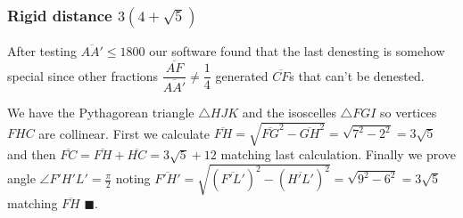 \documentclass[11pt]{article}
\begin{document}
\subsubsection{Rigid distance $3(4 + \sqrt5)$}

After testing $\overline{AA'} \le 1800$ our software found that the last denesting is somehow special since other fractions $\dfrac{\overline{AF}}{\overline{AA'}} \neq \dfrac{1}4$ generated $\overline{CF}$s that can't be denested.

We have the Pythagorean triangle $\triangle{HJK}$ and the isoscelles $\triangle{FGI}$ so vertices $FHC$ are collinear. First we calculate $\overline{FH} = \sqrt{\overline{FG}^2 - \overline{GH}^2} = \sqrt{7^2 - 2^2} = 3\sqrt5$ and then $\overline{FC} = \overline{FH} + \overline{HC} = 3\sqrt{5} + 12$ matching last calculation. Finally we prove angle $\angle{F'H'L'} = \frac{\pi}2$ noting $\overline{F'H'} = \sqrt{(\overline{F'L'})^2 - (\overline{H'L'})^2} = \sqrt{9^2 - 6^2} = 3\sqrt5$ matching $\overline{FH}$ $\blacksquare$.
\end{document}

